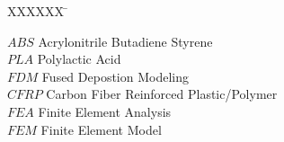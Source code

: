 
\begin{tabbing}

  XXXXXX \= \kill%

  $ABS$ \> Acrylonitrile Butadiene Styrene\\
  $PLA$ \> Polylactic Acid\\
  $FDM$ \> Fused Depostion Modeling\\
  $CFRP$ \> Carbon Fiber Reinforced Plastic/Polymer\\
  $FEA$ \> Finite Element Analysis\\
  $FEM$ \> Finite Element Model\\
  
\end{tabbing}

